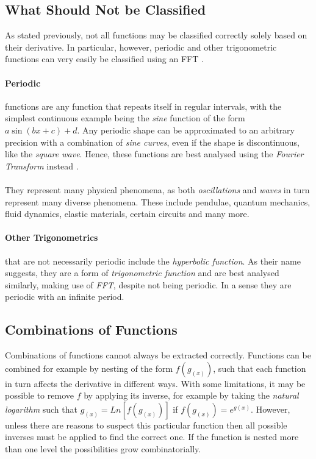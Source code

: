 \documentclass[main.tex]{subfiles}
\begin{document}
    \subsection{What Should Not be Classified}
      
      As stated previously, not all functions may be classified correctly solely based on their derivative. In particular, however, periodic and other trigonometric functions can very easily be classified using an FFT \cite{}.
      \paragraph{Periodic} functions are any function that repeats itself in regular intervals, with the simplest continuous example being the \textit{sine} function of the form $a \sin(b x + c) + d$. Any periodic shape can be approximated to an arbitrary precision with a combination of \textit{sine curves}, even if the shape is discontinuous, like the \textit{square wave}. Hence, these functions are best analysed using the \textit{Fourier Transform} instead \cite{}.
      \\\\
      They represent many physical phenomena, as both \textit{oscillations} and \textit{waves} in turn represent many diverse phenomena. These include pendulae, quantum mechanics, fluid dynamics, elastic materials, certain circuits and many more.
      \paragraph{Other Trigonometrics} that are not necessarily periodic include the \textit{hyperbolic function}. As their name suggests, they are a form of \textit{trigonometric function} and are best analysed similarly, making use of \textit{FFT}, despite not being periodic. In a sense they are periodic with an infinite period. 
    
    \subsection{Combinations of Functions}
      Combinations of functions cannot always be extracted correctly. Functions can be combined for example by nesting of the form $f(g_{(x)})$, such that each function in turn affects the derivative in different ways. With some limitations, it may be possible to remove $f$ by applying its inverse, for example by taking the \textit{natural logarithm} such that $g_{(x)}=Ln\left [ f(g_{(x)})\right ]$ if $f(g_{(x)}) = e^{g(x)}$. However, unless there are reasons to suspect this particular function then all possible inverses must be applied to find the correct one. If the function is nested more than one level the possibilities grow combinatorially. 
      
\end{document}
